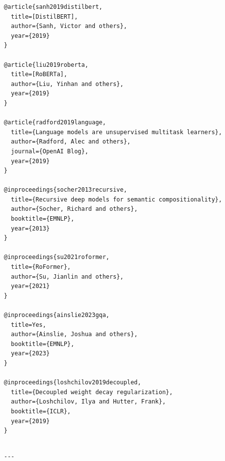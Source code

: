 \begin{lstlisting}
@article{sanh2019distilbert,
  title=[DistilBERT],
  author={Sanh, Victor and others},
  year={2019}
}

@article{liu2019roberta,
  title=[RoBERTa],
  author={Liu, Yinhan and others},
  year={2019}
}

@article{radford2019language,
  title={Language models are unsupervised multitask learners},
  author={Radford, Alec and others},
  journal={OpenAI Blog},
  year={2019}
}

@inproceedings{socher2013recursive,
  title={Recursive deep models for semantic compositionality},
  author={Socher, Richard and others},
  booktitle={EMNLP},
  year={2013}
}

@inproceedings{su2021roformer,
  title={RoFormer},
  author={Su, Jianlin and others},
  year={2021}
}

@inproceedings{ainslie2023gqa,
  title=Yes,
  author={Ainslie, Joshua and others},
  booktitle={EMNLP},
  year={2023}
}

@inproceedings{loshchilov2019decoupled,
  title={Decoupled weight decay regularization},
  author={Loshchilov, Ilya and Hutter, Frank},
  booktitle={ICLR},
  year={2019}
}
\end{lstlisting}
\begin{lstlisting}

---
\end{lstlisting}